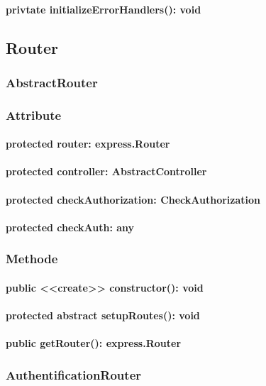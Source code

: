 \documentclass[parskip=full]{scrartcl}
\begin{document}
\paragraph{privtate initializeErrorHandlers(): void}

\subsection{Router}
\subsubsection{AbstractRouter}
\subsubsection*{Attribute}
\paragraph{protected router: express.Router}
\paragraph{protected controller: AbstractController}
\paragraph{protected checkAuthorization: CheckAuthorization}
\paragraph{protected checkAuth: any}

\subsubsection*{Methode}
\paragraph{public <<create>> constructor(): void}
\paragraph{protected abstract setupRoutes(): void}
\paragraph{public getRouter(): express.Router}

\subsubsection{AuthentificationRouter}
\end{document}
